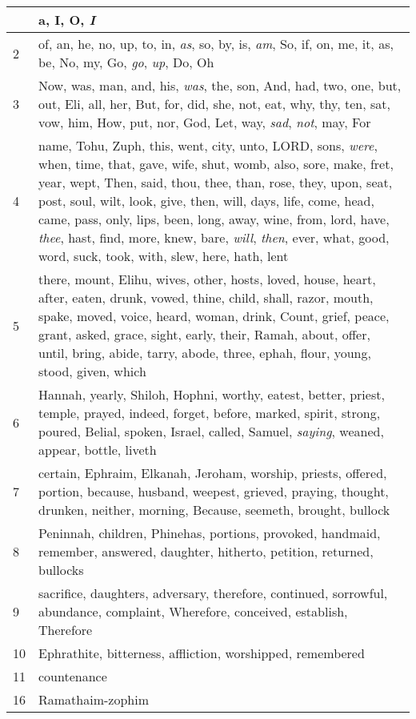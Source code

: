 \begin{longtable}{l|p{3.75in}}
\hline \hline
\endlastfoot
1 & a, I, O, \emph{I} \\ \hline
2 & of, an, he, no, up, to, in, \emph{as}, so, by, is, \emph{am}, So, if, on, me, it, as, be, No, my, Go, \emph{go}, \emph{up}, Do, Oh \\ \hline
3 & Now, was, man, and, his, \emph{was}, the, son, And, had, two, one, but, out, Eli, all, her, But, for, did, she, not, eat, why, thy, ten, sat, vow, him, How, put, nor, God, Let, way, \emph{sad}, \emph{not}, may, For \\ \hline
4 & name, Tohu, Zuph, this, went, city, unto, LORD, sons, \emph{were}, when, time, that, gave, wife, shut, womb, also, sore, make, fret, year, wept, Then, said, thou, thee, than, rose, they, upon, seat, post, soul, wilt, look, give, then, will, days, life, come, head, came, pass, only, lips, been, long, away, wine, from, lord, have, \emph{thee}, hast, find, more, knew, bare, \emph{will}, \emph{then}, ever, what, good, word, suck, took, with, slew, here, hath, lent \\ \hline
5 & there, mount, Elihu, wives, other, hosts, loved, house, heart, after, eaten, drunk, vowed, thine, child, shall, razor, mouth, spake, moved, voice, heard, woman, drink, Count, grief, peace, grant, asked, grace, sight, early, their, Ramah, about, offer, until, bring, abide, tarry, abode, three, ephah, flour, young, stood, given, which \\ \hline
6 & Hannah, yearly, Shiloh, Hophni, worthy, eatest, better, priest, temple, prayed, indeed, forget, before, marked, spirit, strong, poured, Belial, spoken, Israel, called, Samuel, \emph{saying}, weaned, appear, bottle, liveth \\ \hline
7 & certain, Ephraim, Elkanah, Jeroham, worship, priests, offered, portion, because, husband, weepest, grieved, praying, thought, drunken, neither, morning, Because, seemeth, brought, bullock \\ \hline
8 & Peninnah, children, Phinehas, portions, provoked, handmaid, remember, answered, daughter, hitherto, petition, returned, bullocks \\ \hline
9 & sacrifice, daughters, adversary, therefore, continued, sorrowful, abundance, complaint, Wherefore, conceived, establish, Therefore \\ \hline
10 & Ephrathite, bitterness, affliction, worshipped, remembered \\ \hline
11 & countenance \\ \hline
16 & Ramathaim-zophim \\ \hline
\end{longtable}






